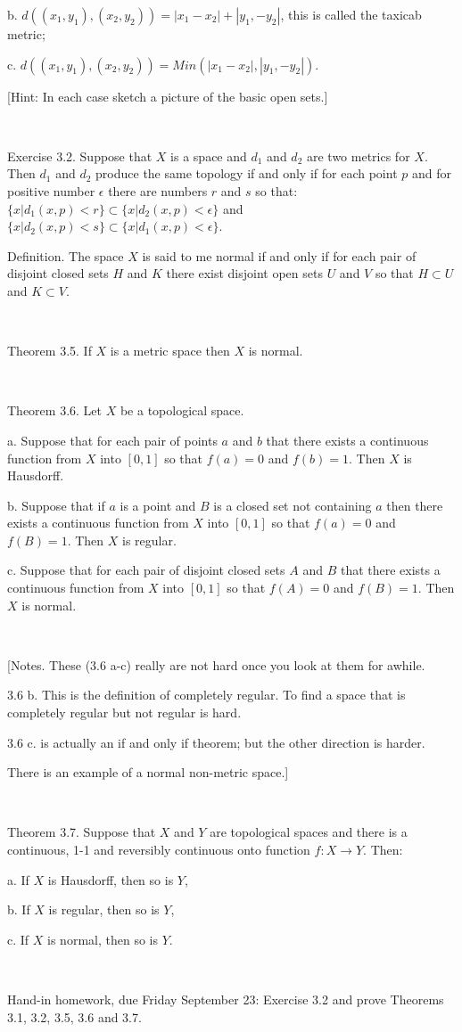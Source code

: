 \documentclass[12pt, std]{article}
\begin{document}
\qquad b. $d((x_1,y_1), (x_2, y_2)) = |x_1 - x_2| + |y_1, -y_2|$,
this is called the taxicab metric;

\qquad c.  $d((x_1,y_1), (x_2, y_2)) = Min(|x_1 - x_2|, |y_1,
-y_2|)$.

[Hint: In each case sketch a picture of the basic open sets.]

\

Exercise 3.2.  Suppose that $X$ is a space and $d_1$ and $d_2$ are
two metrics for $X$.  Then $d_1$ and $d_2$ produce the same topology
if and only if for each point $p$ and for positive number $\epsilon$
there are numbers $r$ and $s$ so that:  $\{ x | d_1(x,p) < r \}
\subset \{ x | d_2(x,p) < \epsilon \}$ and $\{ x | d_2(x,p) < s \}
\subset \{ x | d_1(x,p) < \epsilon \}$.


Definition.  The space $X$ is said to me normal if and only if for
each pair of disjoint closed sets $H$ and $K$ there exist disjoint
open sets $U$ and $V$ so that $H \subset U$ and $K\subset V$.

\

Theorem 3.5.  If $X$ is a metric space then $X$ is normal.

\

Theorem 3.6.  Let $X$ be a topological space.

\qquad a. Suppose that for each pair of points $a$ and $b$ that
there exists a continuous function from $X$ into $[0,1]$ so that
$f(a) = 0$ and $f(b) = 1$.  Then $X$ is Hausdorff.

\qquad b.  Suppose that if $a$ is a point and $B$ is a closed set
not containing $a$ then there exists a continuous function from $X$
into $[0,1]$ so that $f(a) = 0$ and $f(B) = 1$.  Then $X$ is
regular.

\qquad c.  Suppose that for each pair of disjoint closed sets $A$
and $B$ that there exists a continuous function from $X$ into
$[0,1]$ so that $f(A) = 0$ and $f(B) = 1$.  Then $X$ is normal.

\

[Notes.  These (3.6 a-c) really are not hard once you look at them
for awhile.

3.6 b.  This is the definition of completely regular.  To find a
space that is completely regular but not regular is hard.

3.6 c. is actually an if and only if theorem; but the other
direction is harder.

There is an example of a normal non-metric space.]

\

Theorem 3.7.  Suppose that $X$ and $Y$ are topological spaces and
there is a continuous, 1-1 and reversibly continuous onto function
$f: X \rightarrow Y$.  Then:

\qquad a. If $X$ is Hausdorff, then so is $Y$,

\qquad b. If $X$ is regular, then so is $Y$,

\qquad c. If $X$ is normal, then so is $Y$.

\

Hand-in homework, due Friday September 23: Exercise 3.2 and prove Theorems 3.1, 3.2, 3.5, 3.6 and
3.7.
\end{document}
